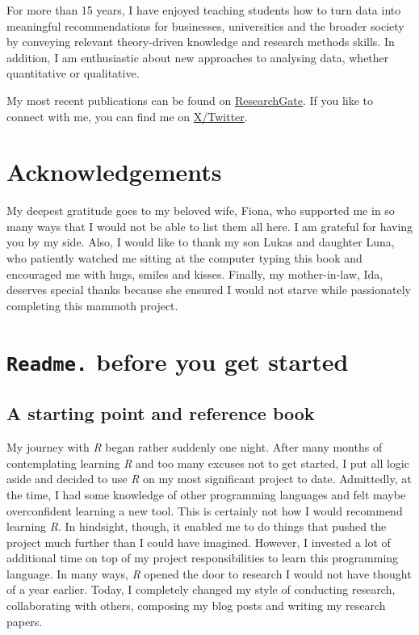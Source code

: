 \documentclass[
  letterpaper,
  DIV=11,
  numbers=noendperiod]{scrreprt}
\begin{document}
For more than 15 years, I have enjoyed teaching students how to turn
data into meaningful recommendations for businesses, universities and
the broader society by conveying relevant theory-driven knowledge and
research methods skills. In addition, I am enthusiastic about new
approaches to analysing data, whether quantitative or qualitative.

My most recent publications can be found on
\href{https://www.researchgate.net/profile/Daniel-Dauber}{ResearchGate}.
If you like to connect with me, you can find me on
\href{https://twitter.com/daniel_dauber}{X/Twitter}.


\chapter*{Acknowledgements}\label{sec-acknowledgements}


My deepest gratitude goes to my beloved wife, Fiona, who supported me in
so many ways that I would not be able to list them all here. I am
grateful for having you by my side. Also, I would like to thank my son
Lukas and daughter Luna, who patiently watched me sitting at the
computer typing this book and encouraged me with hugs, smiles and
kisses. Finally, my mother-in-law, Ida, deserves special thanks because
she ensured I would not starve while passionately completing this
mammoth project.


\chapter{\texorpdfstring{\texttt{Readme.} before you get
started}{Readme. before you get started}}\label{sec-readme-before-you-get-started}

\section{A starting point and reference
book}\label{sec-a-starting-point-and-reference-book}

My journey with \emph{R} began rather suddenly one night. After many
months of contemplating learning \emph{R} and too many excuses not to
get started, I put all logic aside and decided to use \emph{R} on my
most significant project to date. Admittedly, at the time, I had some
knowledge of other programming languages and felt maybe overconfident
learning a new tool. This is certainly not how I would recommend
learning \emph{R}. In hindsight, though, it enabled me to do things that
pushed the project much further than I could have imagined. However, I
invested a lot of additional time on top of my project responsibilities
to learn this programming language. In many ways, \emph{R} opened the
door to research I would not have thought of a year earlier. Today, I
completely changed my style of conducting research, collaborating with
others, composing my blog posts and writing my research papers.
\end{document}
